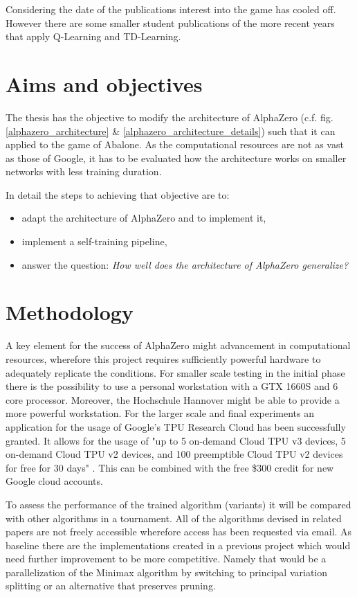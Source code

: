 \documentclass{../lib/llncs}
\begin{document}
Considering the date of the publications interest into the game has cooled off. However there are some smaller student publications of the more recent years that apply Q-Learning and TD-Learning. \cite{mizrachi_introduction_2017} \cite{lee_abalone_2005}

\section{Aims and objectives}
The thesis has the objective to modify the architecture of AlphaZero (c.f. fig. \ref{alphazero_architecture} \& \ref{alphazero_architecture_details}) such that it can applied to the game of Abalone. As the computational resources are not as vast as those of Google, it has to be evaluated how the architecture works on smaller networks with less training duration.

In detail the steps to achieving that objective are to:

\begin{itemize}
  \item adapt the architecture of AlphaZero and to implement it,
  \item implement a self-training pipeline,
  \item answer the question: \textit{How well does the architecture of AlphaZero generalize?}
\end{itemize}

\section{Methodology}
A key element for the success of AlphaZero might advancement in computational resources, wherefore this project requires sufficiently powerful hardware to adequately replicate the conditions. For smaller scale testing in the initial phase there is the possibility to use a personal workstation with a GTX 1660S and 6 core processor. Moreover, the Hochschule Hannover might be able to provide a more powerful workstation. For the larger scale and final experiments an application for the usage of Google's TPU Research Cloud has been successfully granted. It allows for the usage of "up to 5 on-demand Cloud TPU v3 devices, 5 on-demand Cloud TPU v2 devices, and 100 preemptible Cloud TPU v2 devices for free for 30 days" \cite{noauthor_tpu_nodate}. This can be combined with the free \$300 credit for new Google cloud accounts. \cite{noauthor_free_nodate}

To assess the performance of the trained algorithm (variants) it will be compared with other algorithms in a tournament. All of the algorithms devised in related papers are not freely accessible wherefore access has been requested via email. As baseline there are the implementations created in a previous project \cite{noauthor_ture_nodate} which would need further improvement to be more competitive. Namely that would be a parallelization of the Minimax algorithm by switching to principal variation splitting or an alternative that preserves pruning. \cite{gao_multithreaded_nodate}
\end{document}
